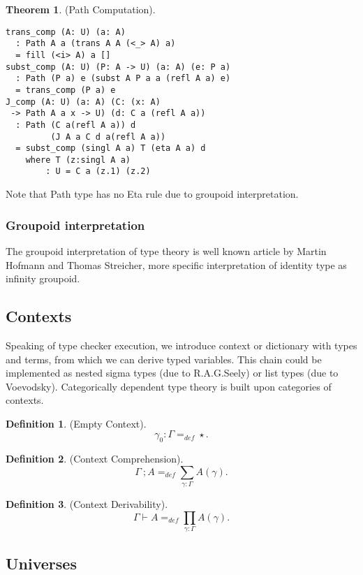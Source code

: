 \documentclass{article}
\theoremstyle{definition}
\newtheorem{theorem}{Theorem}
\newtheorem{definition}{Definition}
\begin{document}
\begin{theorem} (Path Computation).
\begin{lstlisting}
trans_comp (A: U) (a: A)
  : Path A a (trans A A (<_> A) a)
  = fill (<i> A) a []
subst_comp (A: U) (P: A -> U) (a: A) (e: P a)
  : Path (P a) e (subst A P a a (refl A a) e)
  = trans_comp (P a) e
J_comp (A: U) (a: A) (C: (x: A)
 -> Path A a x -> U) (d: C a (refl A a))
  : Path (C a(refl A a)) d
         (J A a C d a(refl A a))
  = subst_comp (singl A a) T (eta A a) d
    where T (z:singl A a)
        : U = C a (z.1) (z.2)
\end{lstlisting}
\end{theorem}

Note that  Path type has no Eta rule due to groupoid interpretation.

\subsubsection*{Groupoid interpretation}

The groupoid interpretation of type theory is well known article by Martin Hofmann and Thomas Streicher,
more specific interpretation of identity type as infinity groupoid.

\subsection{Contexts}

Speaking of type checker execution, we introduce context or dictionary with types and terms,
from which we can derive typed variables. This chain could be implemented as
nested sigma types (due to R.A.G.Seely) or list types (due to Voevodsky). Categorically
dependent type theory is built upon categories of contexts.

\begin{definition} (Empty Context).
$$
    \gamma_0 : \Gamma =_{def} \star.
$$
\end{definition}

\begin{definition} (Context Comprehension).
$$
\Gamma\ ; A =_{def} \sum_{\gamma:\Gamma}A(\gamma).
$$
\end{definition}

\begin{definition} (Context Derivability).
$$
\Gamma \vdash A =_{def} \prod_{\gamma:\Gamma}A(\gamma).
$$
\end{definition}

\subsection{Universes}
\end{document}
